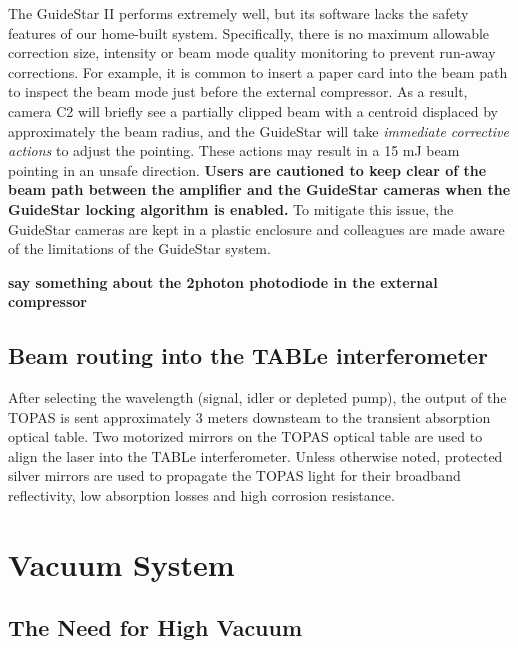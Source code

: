 The GuideStar II performs extremely well, but its software lacks the safety features of our home-built system. Specifically, there is no maximum allowable correction size, intensity or beam mode quality monitoring to prevent run-away corrections. For example, it is common to insert a paper card into the beam path to inspect the beam mode just before the external compressor. As a result, camera C2 will briefly see a partially clipped beam with a centroid displaced by approximately the beam radius, and the GuideStar will take \textit{immediate corrective actions} to adjust the pointing. These actions may result in a 15 mJ beam pointing in an unsafe direction. \textbf{Users are cautioned to keep clear of the beam path between the amplifier and the GuideStar cameras when the GuideStar locking algorithm is enabled.} To mitigate this issue, the GuideStar cameras are kept in a plastic enclosure and colleagues are made aware of the limitations of the GuideStar system.

\textbf{say something about the 2photon photodiode in the external compressor}

\subsection{Beam routing into the TABLe interferometer}

After selecting the wavelength (signal, idler or depleted pump), the output of the TOPAS is sent approximately 3 meters downsteam to the transient absorption optical table. Two motorized mirrors on the TOPAS optical table are used to align the laser into the TABLe interferometer. Unless otherwise noted, protected silver mirrors are used to propagate the TOPAS light for their broadband reflectivity, low absorption losses and high corrosion resistance. 

\section{Vacuum System}
\label{sec:Vacuum_System}
\subsection{The Need for High Vacuum}

